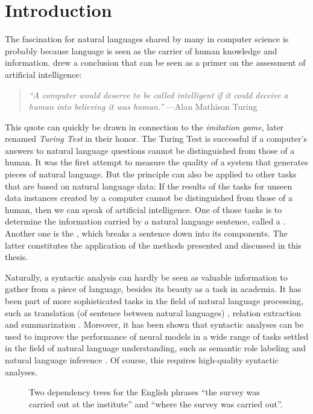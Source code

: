 \documentclass[../document.tex]{subfiles}
\begin{document}
    \chapter{Introduction}
    The fascination for natural languages shared by many in computer science is probably because language is seen as the carrier of human knowledge and information.
     drew a conclusion that can be seen as a primer on the assessment of artificial intelligence:
    \begin{quote}
        \emph{``A computer would deserve to be called intelligent if it could deceive a human into believing it was human.''} \hfill ---Alan Mathison Turing
    \end{quote}
    This quote can quickly be drawn in connection to the \emph{imitation game}, later renamed \emph{Turing Test} in their honor.
    The Turing Test is successful if a computer's answers to natural language questions cannot be distinguished from those of a human.
    It was the first attempt to measure the quality of a system that generates pieces of natural language.
    But the principle can also be applied to other tasks that are based on natural language data:
        If the results of the tasks for unseen data instances created by a computer cannot be distinguished from those of a human, then we can speak of artificial intelligence.
    One of those tasks is to determine the information carried by a natural language sentence, called a .
    Another one is the , which breaks a sentence down into its components.
    The latter constitutes the application of the methods presented and discussed in this thesis.

    Naturally, a syntactic analysis can hardly be seen as valuable information to gather from a piece of language, besides its beauty as a task in academia.
    It has been part of more sophisticated tasks in the field of natural language processing, such as translation (of sentence between natural languages) \citep{Zhang19,Yang22}, relation extraction \citep{Ngu19} and summarization \citep{Bal21}.
    Moreover, it has been shown that syntactic analyses can be used to improve the performance of neural models in a wide range of tasks settled in the field of natural language understanding, such as semantic role labeling and natural language inference \citep{Liu19, Wang19, Fei20}.
    Of course, this requires high-quality syntactic analyses.

    \begin{figure}
        \null\hfill
        
        \hfill
        
        \hfill\null
        \caption{\label{fig:dependency}
            Two dependency trees for the English phrases ``the survey was carried out at the institute'' and ``where the survey was carried out''.
        }
    \end{figure}
\end{document}
